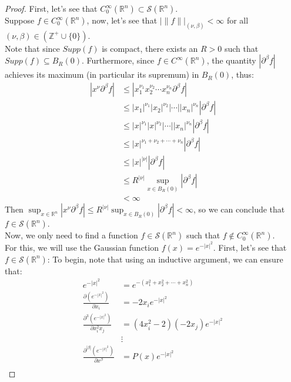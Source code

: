 \begin{proof}{}
  First, let's see that $C^{\infty}_{0}(\mathbb{R}^n) \subset \mathcal{S}(\mathbb{R}^n)$.\\
  Suppose $f \in C^{\infty}_{0}(\mathbb{R}^n)$, now, let's see that $|\|f\||_{(\nu,\beta)} < \infty$ for all $(\nu,\beta) \in (\mathbb{Z}^+ \cup \{0\})$.\\
  Note that since $Supp(f)$ is compact, there exists an $R > 0$ such that $Supp(f) \subseteq B_{R}(0)$. Furthermore, since $f \in C^{\infty}(\mathbb{R}^n)$, the quantity $|\partial^{\beta}f|$ achieves its maximum (in particular its supremum) in $B_{R}(0)$, thus:
  \begin{align*}
    |x^{\nu} \partial^{\beta}f| &\leq |x_1^{\nu_1}x_2^{\nu_2}\cdots x_n^{\nu_n}\partial^{\beta}f| \\
    &\leq |x_1|^{\nu_1}|x_2|^{\nu_2}|\cdots||x_n|^{\nu_n}|\partial^{\beta}f| \\
    &\leq |x|^{\nu_1}|x|^{\nu_2}|\cdots||x_n|^{\nu_n}|\partial^{\beta}f| \\
    &\leq |x|^{\nu_1 + \nu_2 + \cdots + \nu_n}|\partial^{\beta}f| \\
    &\leq |x|^{|\nu|}|\partial^{\beta}f| \\
    &\leq R^{|\nu|}\sup_{x \in B_{R}(0)}|\partial^{\beta}f| \\
    &< \infty
  \end{align*}
  Then $\sup_{x \in \mathbb{R}^n} |x^{\nu} \partial^{\beta} f| \leq R^{|\nu|} \sup_{x \in B_{R}(0)} |\partial^{\beta} f| < \infty$, so we can conclude that $f \in \mathcal{S}(\mathbb{R}^n)$.\\
  Now, we only need to find a function $f \in \mathcal{S}(\mathbb{R}^n)$ such that $f \notin C^{\infty}_{0}(\mathbb{R}^n)$.\\
  For this, we will use the Gaussian function $f(x) = e^{-|x|^2}$. First, let's see that $f \in \mathcal{S}(\mathbb{R}^n)$:
  To begin, note that using an inductive argument, we can ensure that:
  \begin{align*}
    e^{-|x|^2} &= e^{-(x_1^2 + x_2^2 + \cdots + x_n^2)}\\
    \frac{\partial (e^{-|x|^2})}{\partial x_i} &= -2x_i e^{-|x|^2}\\
    \frac{\partial^3 (e^{-|x|^2})}{\partial x_i^2 x_j} &= (4x_i^2 - 2)(-2x_j)e^{-|x|^2}\\
    &\vdots\\
    \frac{\partial^{|\beta|} (e^{-|x|^2})}{\partial x^{\beta}} &= P(x)e^{-|x|^2}\\

\end{align*}
\end{proof}
